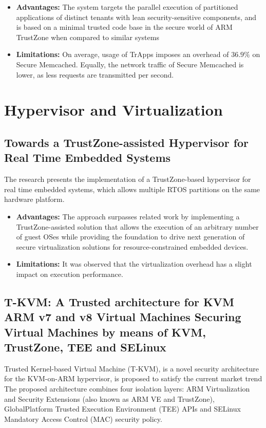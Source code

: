\documentclass[conference]{IEEEtran}
\begin{document}
\begin{itemize}
    \item \textbf{Advantages:} The system targets the parallel execution of partitioned applications of distinct tenants with lean security-sensitive components, and is based on a minimal trusted code base in the secure world of ARM TrustZone when compared to similar systems
    \item \textbf{Limitations:} On average, usage of TrApps imposes an overhead of $36.9\%$ on Secure Memcached. Equally, the network traffic of Secure Memcached is lower, as less requests are transmitted per second.
\end{itemize}

\section{Hypervisor and Virtualization}

\subsection{Towards a TrustZone-assisted Hypervisor for Real Time Embedded Systems}
\cite{hyper1} The research presents the implementation of a TrustZone-based hypervisor for real time embedded systems, which allows multiple RTOS partitions on the same hardware platform.

\begin{itemize}
    \item \textbf{Advantages:} The approach surpasses related work by implementing a TrustZone-assisted solution that allows the execution of an arbitrary number of guest OSes while providing the foundation to drive next generation of secure virtualization solutions for resource-constrained embedded devices.
    \item \textbf{Limitations:} It was observed that the virtualization overhead has a slight impact on execution performance.
\end{itemize}

\subsection{T-KVM: A Trusted architecture for KVM ARM v7 and v8 Virtual Machines Securing Virtual Machines by means of KVM, TrustZone, TEE and SELinux}
\cite{hyper2} Trusted Kernel-based Virtual Machine (T-KVM), is a novel security architecture for the KVM-on-ARM hypervisor, is proposed to satisfy the current market trend The proposed architecture combines four isolation layers: ARM Virtualization and Security Extensions (also known as ARM VE and TrustZone), GlobalPlatform Trusted Execution Environment (TEE) APIs and SELinux Mandatory Access Control (MAC) security policy.
\end{document}
